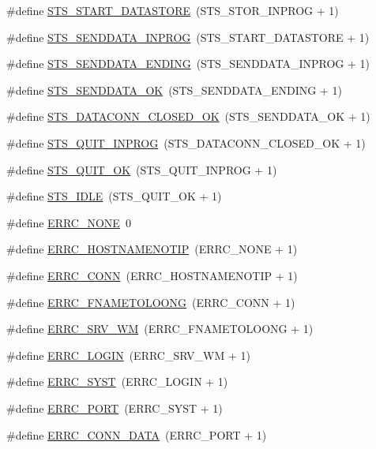 \begin{DoxyCompactItemize}
\item 
\#define \hyperlink{group__ftp_ga731fe84d2369ca6d827155e2ea9ccd37}{STS\_\-START\_\-DATASTORE}~(STS\_\-STOR\_\-INPROG + 1)
\item 
\#define \hyperlink{group__ftp_ga7b458125d1689f371be4a21634a64d44}{STS\_\-SENDDATA\_\-INPROG}~(STS\_\-START\_\-DATASTORE + 1)
\item 
\#define \hyperlink{group__ftp_ga4ab0222f5cbb2d0a6d1c7eae704ecb6e}{STS\_\-SENDDATA\_\-ENDING}~(STS\_\-SENDDATA\_\-INPROG + 1)
\item 
\#define \hyperlink{group__ftp_ga0b465a6954f60bdf103c9d38a7583f5e}{STS\_\-SENDDATA\_\-OK}~(STS\_\-SENDDATA\_\-ENDING + 1)
\item 
\#define \hyperlink{group__ftp_ga3f47db8c6627d293105434023a806837}{STS\_\-DATACONN\_\-CLOSED\_\-OK}~(STS\_\-SENDDATA\_\-OK + 1)
\item 
\#define \hyperlink{group__ftp_ga9d554fecc84e40fc5afcc97ce4130443}{STS\_\-QUIT\_\-INPROG}~(STS\_\-DATACONN\_\-CLOSED\_\-OK + 1)
\item 
\#define \hyperlink{group__ftp_ga53b4f88911b5cf48a56f24d5ebefdb7a}{STS\_\-QUIT\_\-OK}~(STS\_\-QUIT\_\-INPROG + 1)
\item 
\#define \hyperlink{group__ftp_ga6be5ad15a4a71e84d34d984b75f9904a}{STS\_\-IDLE}~(STS\_\-QUIT\_\-OK + 1)
\item 
\#define \hyperlink{group__ftp_gacc19481d3bff7e3c8e3b8804d2d2afcf}{ERRC\_\-NONE}~0
\item 
\#define \hyperlink{group__ftp_ga1c8411c28dee6c0b2d222a447e2995f8}{ERRC\_\-HOSTNAMENOTIP}~(ERRC\_\-NONE + 1)
\item 
\#define \hyperlink{group__ftp_gad095bd01c68b22025a316e548cc955b5}{ERRC\_\-CONN}~(ERRC\_\-HOSTNAMENOTIP + 1)
\item 
\#define \hyperlink{group__ftp_ga4f93f63c6a0a40d34ecb3b0ef0f3d56b}{ERRC\_\-FNAMETOLOONG}~(ERRC\_\-CONN + 1)
\item 
\#define \hyperlink{group__ftp_ga2b8131ed927cfb34404a8b123ad33e1a}{ERRC\_\-SRV\_\-WM}~(ERRC\_\-FNAMETOLOONG + 1)
\item 
\#define \hyperlink{group__ftp_ga21fc8afdf5c1b2ccef85b7d1dab9e291}{ERRC\_\-LOGIN}~(ERRC\_\-SRV\_\-WM + 1)
\item 
\#define \hyperlink{group__ftp_ga2cee1778ee6192399bd5196d8abb81dd}{ERRC\_\-SYST}~(ERRC\_\-LOGIN + 1)
\item 
\#define \hyperlink{group__ftp_gaf92586684d1c458f7675ece8677fe28f}{ERRC\_\-PORT}~(ERRC\_\-SYST + 1)
\item 
\#define \hyperlink{group__ftp_gafdeae57f1aa8e5279b2faf3e3619cfe3}{ERRC\_\-CONN\_\-DATA}~(ERRC\_\-PORT + 1)

\end{DoxyCompactItemize}

